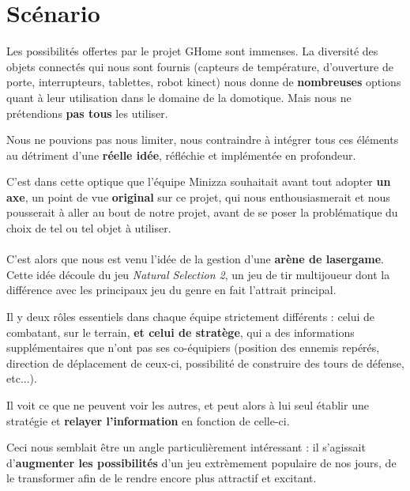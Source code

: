 \section{Scénario}

Les possibilités offertes par le projet GHome sont immenses. La diversité des objets connectés qui nous sont fournis (capteurs de température, d'ouverture de porte, interrupteurs, tablettes, robot kinect) nous donne de \textbf{nombreuses }options quant à leur utilisation dans le domaine de la domotique. Mais nous ne prétendions \textbf{pas tous }les utiliser. 

Nous ne pouvions pas nous limiter, nous contraindre à intégrer tous ces éléments au détriment d'une \textbf{réelle idée}, réfléchie et implémentée en profondeur. 

C'est dans cette optique que l'équipe Minizza souhaitait avant tout adopter \textbf{un axe}, un point de vue \textbf{original }sur ce projet, qui nous enthousiasmerait et nous pousserait à aller au bout de notre projet, avant de se poser la problématique du choix de tel ou tel objet à utiliser.

\paragraph{}

C'est alors que nous est venu l'idée de la gestion d'une \textbf{arène de lasergame}. Cette idée découle du jeu \textit{Natural Selection 2}, un jeu de tir multijoueur dont la différence avec les principaux jeu du genre en fait l'attrait principal. 

Il y deux rôles essentiels dans chaque équipe strictement différents : celui de combatant, sur le terrain, \textbf{et celui de stratège}, qui a des informations supplémentaires que n'ont pas ses co-équipiers (position des ennemis repérés, direction de déplacement de ceux-ci, possibilité de construire des tours de défense, etc...). 

Il voit ce que ne peuvent voir les autres, et peut alors à lui seul établir une stratégie et \textbf{relayer l'information }en fonction de celle-ci.

Ceci nous semblait être un angle particulièrement intéressant : il s'agissait d'\textbf{augmenter les possibilités }d'un jeu extrèmement populaire de nos jours, de le transformer afin de le rendre encore plus attractif et excitant.

\paragraph{}

